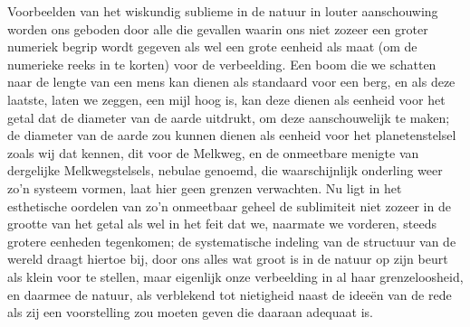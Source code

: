 Voorbeelden van het wiskundig sublieme in de natuur in louter aanschouwing worden ons geboden door alle die gevallen waarin ons niet zozeer een groter numeriek begrip wordt gegeven als wel een grote eenheid als maat (om de numerieke reeks in te korten) voor de verbeelding. Een boom die we schatten naar de lengte van een mens kan dienen als standaard voor een berg, en als deze laatste, laten we zeggen, een mijl hoog is, kan deze dienen als eenheid voor het getal dat de diameter van de aarde uitdrukt, om deze aanschouwelijk te maken; de diameter van de aarde zou kunnen dienen als eenheid voor het planetenstelsel zoals wij dat kennen, dit voor de Melkweg, en de onmeetbare menigte van dergelijke Melkwegstelsels, nebulae genoemd, die waarschijnlijk onderling weer zo’n systeem vormen, laat hier geen grenzen verwachten. Nu ligt in het esthetische oordelen van zo’n onmeetbaar geheel de sublimiteit niet zozeer in de grootte van het getal als wel in het feit dat we, naarmate we vorderen, steeds grotere eenheden tegenkomen; de systematische indeling van de structuur van de wereld draagt hiertoe bij, door ons alles wat groot is in de natuur op zijn beurt als klein voor te stellen, maar eigenlijk onze verbeelding in al haar grenzeloosheid, en daarmee de natuur, als verblekend tot nietigheid naast de ideeën van de rede als zij een voorstelling zou moeten geven die daaraan adequaat is.

